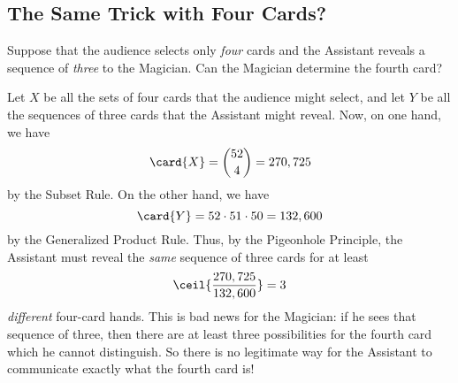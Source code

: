 \subsection{The Same Trick with Four Cards?}\label{4_card_trick_subsec}

Suppose that the audience selects only \emph{four} cards and the
Assistant reveals a sequence of \emph{three} to the Magician.  Can the
Magician determine the fourth card?

Let $X$ be all the sets of four cards that the audience might select,
and let $Y$ be all the sequences of three cards that the Assistant
might reveal.  Now, on one hand, we have
\[
\card{X} = \binom{52}{4} = 270,725
\]
by the Subset Rule.  On the other hand, we have
\[
\card{Y} = 52 \cdot 51 \cdot 50 = 132,600
\]
by the Generalized Product Rule.  Thus, by the Pigeonhole Principle, the
Assistant must reveal the \emph{same} sequence of three cards for at
least
\[
\ceil{\frac{270,725}{132,600}} = 3
\]
\emph{different} four-card hands.  This is bad news for the Magician:
if he sees that sequence of three, then there are at least three
possibilities for the fourth card which he cannot distinguish.  So there
is no legitimate way for the Assistant to communicate exactly what the
fourth card is!

